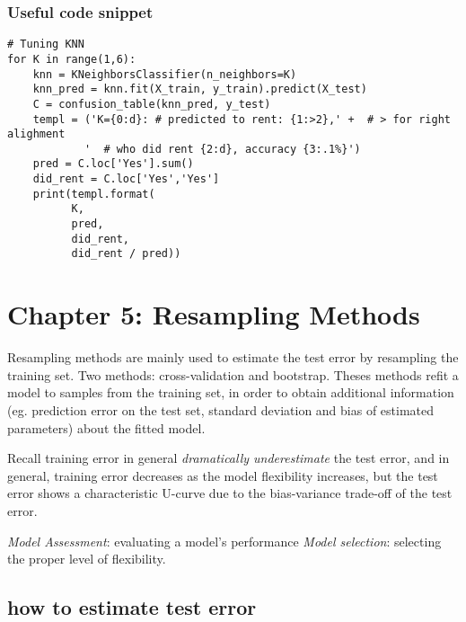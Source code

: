 \documentclass[
  letterpaper,
  DIV=11,
  numbers=noendperiod]{scrreprt}
\begin{document}
\subsection{Useful code snippet}\label{useful-code-snippet}

\begin{verbatim}
# Tuning KNN
for K in range(1,6):
    knn = KNeighborsClassifier(n_neighbors=K)
    knn_pred = knn.fit(X_train, y_train).predict(X_test)
    C = confusion_table(knn_pred, y_test)
    templ = ('K={0:d}: # predicted to rent: {1:>2},' +  # > for right alighment
            '  # who did rent {2:d}, accuracy {3:.1%}')
    pred = C.loc['Yes'].sum()
    did_rent = C.loc['Yes','Yes']
    print(templ.format(
          K,
          pred,
          did_rent,
          did_rent / pred))
\end{verbatim}


\chapter{Chapter 5: Resampling
Methods}\label{chapter-5-resampling-methods}

Resampling methods are mainly used to estimate the test error by
resampling the training set. Two methods: cross-validation and
bootstrap. Theses methods refit a model to samples from the training
set, in order to obtain additional information (eg. prediction error on
the test set, standard deviation and bias of estimated parameters) about
the fitted model.

Recall training error in general \emph{dramatically underestimate} the
test error, and in general, training error decreases as the model
flexibility increases, but the test error shows a characteristic U-curve
due to the bias-variance trade-off of the test error.

\emph{Model Assessment}: evaluating a model's performance \emph{Model
selection}: selecting the proper level of flexibility.

\section{how to estimate test error}\label{how-to-estimate-test-error}
\end{document}
